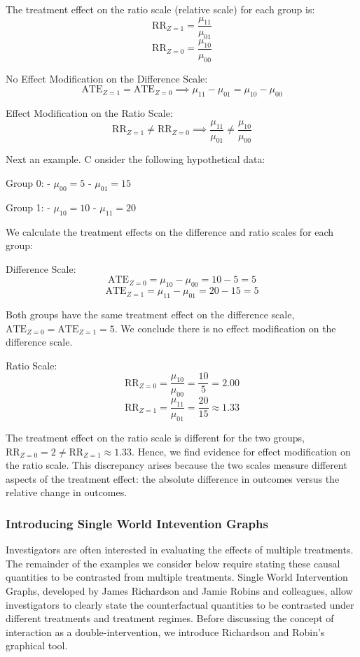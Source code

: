 \documentclass[
  single column]{article}
\begin{document}
The treatment effect on the ratio scale (relative scale) for each group
is: \[
\text{RR}_{Z = 1} = \frac{\mu_{11}}{\mu_{01}}
\] \[
\text{RR}_{Z = 0} = \frac{\mu_{10}}{\mu_{00}}
\]

No Effect Modification on the Difference Scale: \[
\text{ATE}_{Z = 1} = \text{ATE}_{Z = 0} \implies \mu_{11} - \mu_{01} = \mu_{10} - \mu_{00}
\]

Effect Modification on the Ratio Scale: \[
\text{RR}_{Z = 1} \neq \text{RR}_{Z = 0} \implies \frac{\mu_{11}}{\mu_{01}} \neq \frac{\mu_{10}}{\mu_{00}}
\]

Next an example. C onsider the following hypothetical data:

Group 0: - \(\mu_{00} = 5\) - \(\mu_{01} = 15\)

Group 1: - \(\mu_{10} = 10\) - \(\mu_{11} = 20\)

We calculate the treatment effects on the difference and ratio scales
for each group:

Difference Scale: \[
\text{ATE}_{Z = 0} = \mu_{10} - \mu_{00} = 10 - 5 = 5
\] \[
\text{ATE}_{Z = 1} = \mu_{11} - \mu_{01} = 20 - 15 = 5
\]

Both groups have the same treatment effect on the difference scale,
\(\text{ATE}_{Z = 0} = \text{ATE}_{Z = 1} = 5\). We conclude there is no
effect modification on the difference scale.

Ratio Scale: \[
\text{RR}_{Z = 0} = \frac{\mu_{10}}{\mu_{00}} = \frac{10}{5} = 2.00
\] \[
\text{RR}_{Z = 1} = \frac{\mu_{11}}{\mu_{01}} = \frac{20}{15} \approx 1.33
\]

The treatment effect on the ratio scale is different for the two groups,
\(\text{RR}_{Z = 0} = 2 \neq \text{RR}_{Z = 1} \approx 1.33\). Hence, we
find evidence for effect modification on the ratio scale. This
discrepancy arises because the two scales measure different aspects of
the treatment effect: the absolute difference in outcomes versus the
relative change in outcomes.

\subsubsection{Introducing Single World Intevention
Graphs}\label{introducing-single-world-intevention-graphs}

Investigators are often interested in evaluating the effects of multiple
treatments. The remainder of the examples we consider below require
stating these causal quantities to be contrasted from multiple
treatments. Single World Intervention Graphs, developed by James
Richardson and Jamie Robins and colleagues, allow investigators to
clearly state the counterfactual quantities to be contrasted under
different treatments and treatment regimes. Before discussing the
concept of interaction as a double-intervention, we introduce Richardson
and Robin's graphical tool.
\end{document}
